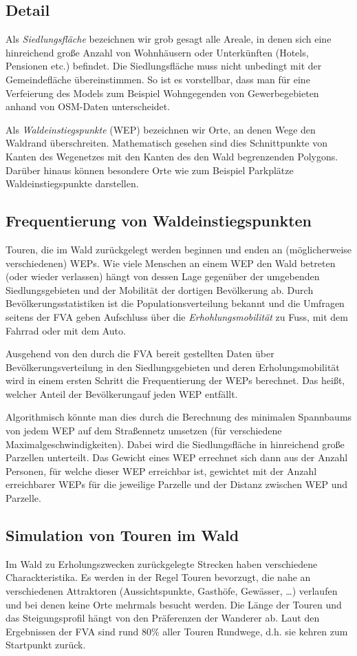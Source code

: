 \documentclass[parskip=half,german]{scrartcl}
\begin{document}
\subsection{Detail}
Als \emph{Siedlungsfläche} bezeichnen wir grob gesagt alle Areale, in denen sich
eine hinreichend große Anzahl von Wohnhäusern oder Unterkünften (Hotels,
Pensionen etc.) befindet. Die Siedlungsfläche muss nicht unbedingt mit der
Gemeindefläche übereinstimmen. So ist es vorstellbar, dass man für eine
Verfeierung des Models zum Beispiel Wohngegenden von Gewerbegebieten
anhand von OSM-Daten unterscheidet.

Als \emph{Waldeinstiegspunkte} (WEP) bezeichnen wir Orte, an denen Wege den
Waldrand überschreiten. Mathematisch gesehen sind dies Schnittpunkte von Kanten
des Wegenetzes mit den Kanten des den Wald begrenzenden Polygons. Darüber hinaus
können besondere Orte wie zum Beispiel Parkplätze Waldeinstiegspunkte
darstellen. 
    
      
\subsection*{Frequentierung von Waldeinstiegspunkten}
Touren, die im Wald zurückgelegt werden beginnen und enden an (möglicherweise
verschiedenen) WEPs. Wie viele Menschen an einem WEP den Wald betreten (oder
wieder verlassen) hängt von dessen Lage gegenüber der umgebenden
Siedlungsgebieten und der Mobilität der dortigen Bevölkerung ab. Durch
Bevölkerungsstatistiken ist die Populationsverteilung bekannt und die Umfragen
seitens der FVA geben Aufschluss über die \emph{Erhohlungsmobilität} zu Fuss,
mit dem Fahrrad oder mit dem Auto.

Ausgehend von den durch die FVA bereit gestellten Daten über
Bevölkerungsverteilung in den Siedlungsgebieten und deren Erholungsmobilität
wird in einem ersten Schritt die Frequentierung der WEPs berechnet. Das heißt,
welcher Anteil der Bevölkerungauf jeden WEP entfällt.

Algorithmisch könnte man dies durch die Berechnung des minimalen Spannbaums
von jedem WEP auf dem Straßennetz umsetzen (für verschiedene
Maximalgeschwindigkeiten). Dabei wird die Siedlungsfläche in hinreichend große
Parzellen unterteilt. Das Gewicht eines WEP errechnet sich dann aus der Anzahl
Personen, für welche dieser WEP erreichbar ist, gewichtet mit der Anzahl
erreichbarer WEPs für die jeweilige Parzelle und der Distanz zwischen WEP und
Parzelle.


\subsection*{Simulation von Touren im Wald}
Im Wald zu Erholungszwecken zurückgelegte Strecken haben verschiedene
Charackteristika. Es werden in der Regel Touren bevorzugt, die nahe an
verschiedenen Attraktoren (Aussichtspunkte, Gasthöfe, Gewässer, \dots)
verlaufen und bei denen keine Orte mehrmals besucht werden.
Die Länge der Touren und das Steigungsprofil hängt von den Präferenzen der
Wanderer ab. Laut den Ergebnissen der FVA sind rund 80\% aller Touren Rundwege,
d.h. sie kehren zum Startpunkt zurück.
\end{document}
